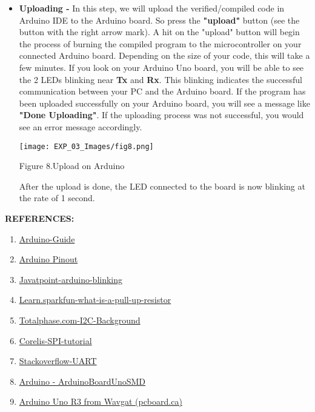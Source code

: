 \documentclass[12pt,a4paper]{article}
\begin{document}
\begin{justify}
\begin{itemize}
\begin{center} 
\texttt{[image: EXP\_03\_Images/fig7.png]}
\end{center}
\begin{center} {Figure 7.Verify on Arduino}\end{center}

\item \textbf{Uploading - }In this step, we will upload the verified/compiled code in Arduino IDE to the Arduino board. So press the \textbf{"upload"} button (see the button with the right arrow mark). A hit on the "upload" button will begin the process of burning the compiled program to the microcontroller on your connected Arduino board. Depending on the size of your code, this will take a few minutes. If you look on your Arduino Uno board, you will be able to see the 2 LEDs blinking near \textbf{Tx} and \textbf{Rx}. This blinking indicates the successful communication between your PC and the Arduino board. If the program has been uploaded successfully on your Arduino board, you will see a message like \textbf{"Done Uploading"}. If the uploading process was not successful, you would see an error message accordingly.  
\begin{center} 
\texttt{[image: EXP\_03\_Images/fig8.png]}
\end{center}
\begin{center} {Figure 8.Upload on Arduino}\end{center}
After the upload is done, the LED connected to the board is now blinking at the rate of 1 second.
\end{itemize}

\setlength{\parindent}{0eM}
\textbf{\large REFERENCES:}
\vspace{-6mm}
\begin{enumerate}
\setlength\itemsep{-0.3em}
\item  \href{https://www.electronicshub.org/getting-started-with-esp32/}{Arduino-Guide}
\item  \href{https://www.arduino.cc/en/Guide}{Arduino Pinout}
\item  \href{https://circuitsboards.blogspot.com/1969/12/arduino-uno-pinout-board.html?m=1}{Javatpoint-arduino-blinking}
\item  \href{https://www.javatpoint.com/arduino-blinking-multiple-leds-using-loop}{Learn.sparkfun-what-is-a-pull-up-resistor}
\item  \href{https://www.totalphase.com/support/articles/200349156-I2C-Background}{Totalphase.com-I2C-Background}
\item  \href{https://www.corelis.com/education/tutorials/spi-tutorial}{Corelis-SPI-tutorial}
\item  \href{https://stackoverflow.com/tags/uart/info }{Stackoverflow-UART}
\item  \href{https://www.arduino.cc/en/Main/ArduinoBoardUnoSMD }{Arduino - ArduinoBoardUnoSMD}
\item  \href{https://www.pcboard.ca/wavgat-arduino-uno-r3}{Arduino Uno R3 from Wavgat (pcboard.ca)}


\end{enumerate}
\end{justify}
\end{document}
